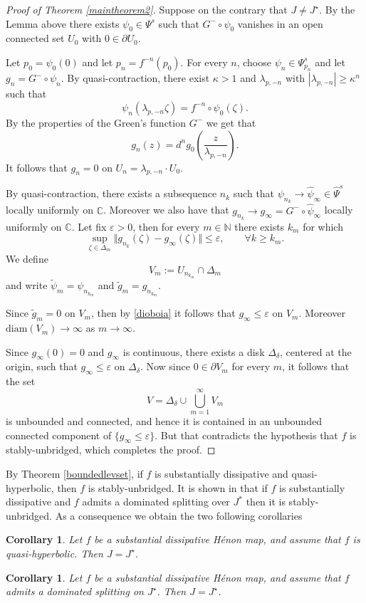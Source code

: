 \documentclass[10pt,a4paper]{article}
\newtheorem{corollary}[theorem]{Corollary}
\begin{document}
\begin{proof}[Proof of Theorem \ref{maintheorem2}]
Suppose on the contrary that $J\neq J^\star$. By the Lemma above there exists $\psi_0\in\Psi^s$ such that $G^-\circ \psi_0$ vanishes in an open connected set $U_0$ with $0\in\partial U_0$.

Let $p_0=\psi_0(0)$ and let $p_n=f^{-n}(p_0)$. For every $n$, choose $\psi_n\in\Psi_{p_n}^s$ and let $g_n=G^-\circ \psi_n$. By quasi-contraction, there exist $\kappa>1$ and $\lambda_{p,-n}$ with $|\lambda_{p,-n}|\geq\kappa^n$ such that
\[
\psi_n(\lambda_{p,-n}\zeta)=f^{-n}\circ\psi_0(\zeta).
\]
By the properties of the Green's function $G^-$ we get that
\[
g_n(z)=d^ng_0\left(\frac{z}{\lambda_{p,-n}}\right).
\]
It follows that $g_n=0$ on $U_n=\lambda_{p,-n} \cdot U_0$.

By quasi-contraction, there exists a subsequence $n_k$ such that $\psi_{n_k}\to\widehat\psi_{\infty}\in\widehat\Psi^s$ locally uniformly on $\mathbb C$. Moreover we also have that $g_{n_k}\to g_\infty=G^-\circ \widehat\psi_\infty$ locally uniformly on $\mathbb C$. Let fix $\varepsilon>0$, then for every $m\in \mathbb N$ there exists $k_m$ for which
\begin{equation}
\label{dioboia}
\sup_{\zeta\in\Delta_m}\Vert g_{n_k}(\zeta)-g_{\infty}(\zeta)\Vert\leq \varepsilon,\qquad \forall k\geq k_m.
\end{equation}
We define
\[
V_m:=U_{n_{k_m}}\cap \Delta_m
\]
and write $\tilde \psi_m=\psi_{n_{k_m}}$ and $\tilde g_m=g_{n_{k_m}}$.

Since $\tilde g_m=0$ on $V_m$, then by \eqref{dioboia} it follows that $g_{\infty}\leq \varepsilon$ on $V_m$. Moreover $\mathrm{diam}(V_m)\to \infty$ as $m\to\infty$.

Since $g_\infty(0)=0$ and $g_\infty$ is continuous, there exists a disk $\Delta_\delta$, centered at the origin, such that $g_\infty\leq \varepsilon$ on $\Delta_\delta$. Now since $0\in\partial V_m$ for every $m$, it follows that the set
\[
V=\Delta_\delta\cup\bigcup_{m=1}^{\infty}V_m
\]
is unbounded and connected, and hence it is contained in an unbounded connected component of $\{g_\infty\leq \varepsilon\}$. But that contradicts the hypothesis that $f$ is stably-unbridged, which completes the proof.
\end{proof}
By Theorem \ref{boundedlevset}, if $f$ is substantially dissipative and quasi-hyperbolic, then $f$ is stably-unbridged. It is shown in \cite{LP2} that if $f$ is substantially dissipative and $f$ admits a dominated splitting over $J^*$ then it is stably-unbridged. As a consequence we obtain the two following corollaries
\begin{corollary}
Let $f$ be a substantial dissipative H\'enon map, and assume that $f$ is quasi-hyperbolic. Then $J = J^\star$.
\end{corollary}
\begin{corollary}
Let $f$ be a substantial dissipative H\'enon map, and assume that $f$ admits a dominated splitting on $J^\star$. Then $J = J^\star$.
\end{corollary}
\printbibliography
\end{document}
